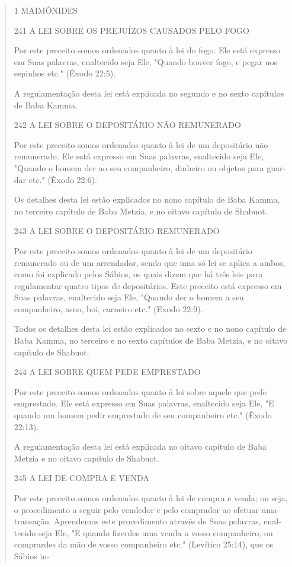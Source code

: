 \begin{quote}
1 MAIMÔNIDES

241 A LEI SOBRE OS PREJUÍZOS CAUSADOS PELO FOGO

Por este preceito somos ordenados quanto à lei do fogo. Ele está
ex­presso em Suas palavras, enaltecido seja Ele, "Quando houver fogo, e
pegar nos espinhos etc." (Êxodo 22:5).

A regulamentação desta lei está explicada no segundo e no sexto
ca­pítulos de Baba Kamma.

242 A LEI SOBRE O DEPOSITÁRIO NÃO REMUNERADO

Por este preceito somos ordenados quanto à lei de um depositário não
remunerado. Ele está expresso em Suas palavras, enaltecido seja Ele,
"Quando o homem der ao seu companheiro, dinheiro ou objetos para
guar­dar etc." (Êxodo 22:6).

Os detalhes desta lei estão explicados no nono capítulo de Baba Kam­ma,
no terceiro capítulo de Baba Metzia, e no oitavo capítulo de Shabuot.

243 A LEI SOBRE O DEPOSITÁRIO REMUNERADO

Por este preceito somos ordenados quanto à lei de um depositário
remunerado ou de um arrendador, sendo que uma só lei se aplica a ambos,
co­mo foi explicado pelos Sábios, os quais dizem que há três leis para
regulamen­tar quatro tipos de depositários. Este preceito está expresso
em Suas palavras, enaltecido seja Ele, "Quando der o homem a seu
companheiro, asno, boi, car­neiro etc." (Exodo 22:9).

Todos os detalhes desta lei estão explicados no sexto e no nono
ca­pítulo de Baba Kamma, no terceiro e no sexto capítulos de Baba
Metzia, e no oitavo capítulo de Shabuot.

244 A LEI SOBRE QUEM PEDE EMPRESTADO

Por este preceito somos ordenados quanto à lei sobre aquele que pede
emprestado. Ele está expresso em Suas palavras, enaltecido seja Ele, "E
quando um homem pedir emprestado de seu companheiro etc." (Êxodo 22:13).

A regulamentação desta lei está explicada no oitavo capítulo de Ba­ba
Metzia e no oitavo capítulo de Shabuot.

245 A LEI DE COMPRA E VENDA

Por este preceito somos ordenados quanto à lei de compra e venda; ou
seja, o procedimento a seguir pelo vendedor e pelo comprador ao efetuar
uma transação. Aprendemos este procedimento através de Suas palavras,
enal­tecido seja Ele, "E quando fizerdes uma venda a vosso companheiro,
ou com­prardes da mão de vosso companheiro etc." (Levítico 25:14), que
os Sábios in-


\end{quote}

